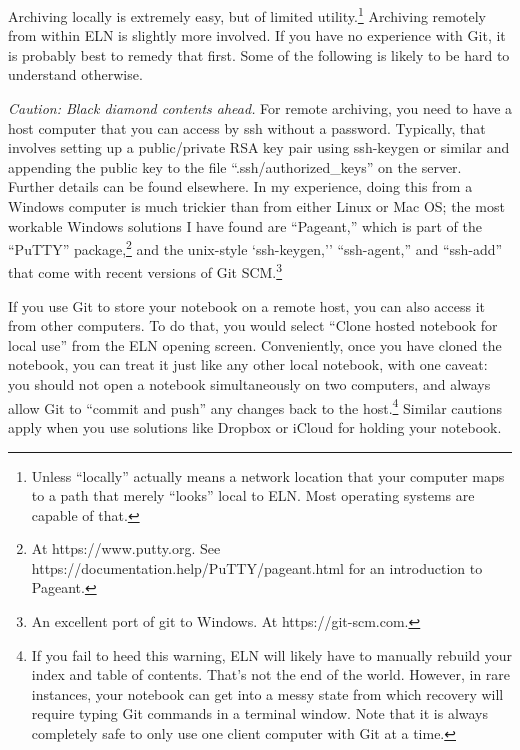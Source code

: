 \documentclass[11pt]{report}
\begin{document}
Archiving locally is extremely easy, but of limited
utility.\footnote{Unless ``locally'' actually means a network location
  that your computer maps to a path that merely ``looks'' local to
  ELN.  Most operating systems are capable of that.} Archiving
remotely from within ELN is slightly more involved. If you have no
experience with Git, it is probably best to remedy that first. Some of
the following is likely to be hard to understand otherwise.

\emph{Caution: Black diamond contents ahead.} For remote archiving,
you need to have a host computer that you can access by ssh without a
password. Typically, that involves setting up a public/private RSA key
pair using ssh-keygen or similar and appending the public key to the
file ``.ssh/authorized\_keys'' on the server. Further details can be
found elsewhere. In my experience, doing this from a Windows computer
is much trickier than from either Linux or Mac OS; the most workable
Windows solutions I have found are ``Pageant,'' which is part of the
``PuTTY'' package,\footnote{At https://www.putty.org. See
  https://documentation.help/PuTTY/pageant.html for an introduction to
  Pageant.} and the unix-style `ssh-keygen,'' ``ssh-agent,'' and
``ssh-add'' that come with recent versions of Git SCM.\footnote{An
  excellent port of git to Windows. At https://git-scm.com.}

If you use Git to store your notebook on a remote host,
you can also access it from other computers. To do that, you would
select ``Clone hosted notebook for local use'' from the ELN opening
screen. Conveniently, once you have cloned the notebook, you can treat
it just like any other local notebook, with one caveat: you should not
open a notebook simultaneously on two computers, and always allow Git
to ``commit and push'' any changes back to the host.\footnote{If you fail to
heed this warning, ELN will likely have to manually rebuild your index
and table of contents. That's not the end of the world. However, in
rare instances, your notebook can get into a messy state from which
recovery will require typing Git commands in a terminal window. Note
that it is always completely safe to only use one client computer with
Git at a time.} Similar cautions apply when you use solutions like
Dropbox or iCloud for holding your notebook.
\end{document}
